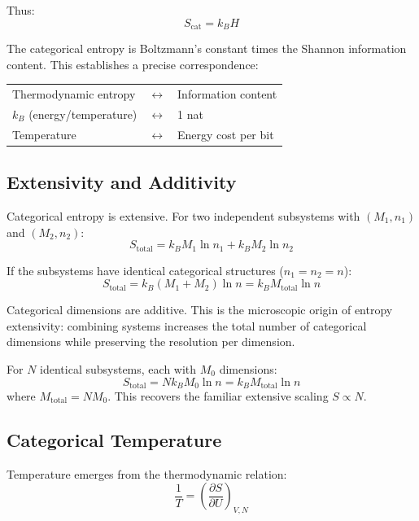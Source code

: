Thus:
\begin{equation}
S_{\text{cat}} = k_B H
\end{equation}

The categorical entropy is Boltzmann's constant times the Shannon information content. This establishes a precise correspondence:
\begin{center}
\begin{tabular}{lcl}
Thermodynamic entropy & $\longleftrightarrow$ & Information content \\
$k_B$ (energy/temperature) & $\longleftrightarrow$ & 1 nat \\
Temperature & $\longleftrightarrow$ & Energy cost per bit \\
\end{tabular}
\end{center}

\subsection{Extensivity and Additivity}

Categorical entropy is extensive. For two independent subsystems with $(M_1, n_1)$ and $(M_2, n_2)$:
\begin{equation}
S_{\text{total}} = k_B M_1 \ln n_1 + k_B M_2 \ln n_2
\end{equation}

If the subsystems have identical categorical structures ($n_1 = n_2 = n$):
\begin{equation}
S_{\text{total}} = k_B (M_1 + M_2) \ln n = k_B M_{\text{total}} \ln n
\end{equation}

Categorical dimensions are additive. This is the microscopic origin of entropy extensivity: combining systems increases the total number of categorical dimensions while preserving the resolution per dimension.

For $N$ identical subsystems, each with $M_0$ dimensions:
\begin{equation}
S_{\text{total}} = N k_B M_0 \ln n = k_B M_{\text{total}} \ln n
\end{equation}
where $M_{\text{total}} = N M_0$. This recovers the familiar extensive scaling $S \propto N$.

\subsection{Categorical Temperature}

Temperature emerges from the thermodynamic relation:
\begin{equation}
\frac{1}{T} = \left(\frac{\partial S}{\partial U}\right)_{V,N}
\end{equation}

